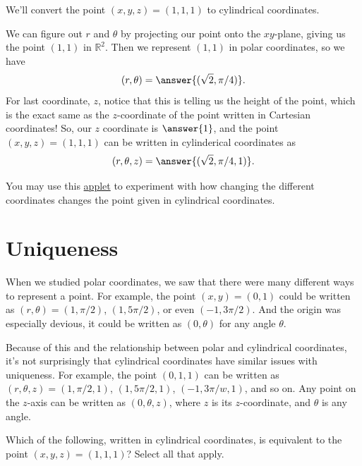 \documentclass{ximera}
\begin{document}
\begin{example}
We'll convert the point $(x,y,z) = (1,1,1)$ to cylindrical coordinates.

We can figure out $r$ and $\theta$ by projecting our point onto the $xy$-plane, giving us the point $(1,1)$ in $\mathbb{R}^2$. Then we represent $(1,1)$ in polar coordinates, so we have
\[
(r,\theta) = \answer{(\sqrt{2}, \pi/4)}.
\]
For last coordinate, $z$, notice that this is telling us the height of the point, which is the exact same as the $z$-coordinate of the point written in Cartesian coordinates! So, our $z$ coordinate is $\answer{1}$, and the point $(x,y,z) = (1,1,1)$ can be written in cylinderical coordinates as
\[
(r,\theta,z) = \answer{(\sqrt{2}, \pi/4, 1)}.
\]
\end{example}

You may use this \href{https://mathinsight.org/cylindrical_coordinates}{applet} to experiment with how changing the different coordinates changes the point given in cylindrical coordinates.

\section*{Uniqueness}

When we studied polar coordinates, we saw that there were many different ways to represent a point. For example, the point $(x,y) = (0,1)$ could be written as $(r,\theta) = (1,\pi/2)$, $(1,5\pi/2)$, or even $(-1,3\pi/2)$. And the origin was especially devious, it could be written as $(0,\theta)$ for any angle $\theta$.

Because of this and the relationship between polar and cylindrical coordinates, it's not surprisingly that cylindrical coordinates have similar issues with uniqueness. For example, the point $(0,1,1)$ can be written as $(r,\theta, z) = (1,\pi/2,1)$, $(1,5\pi/2,1)$, $(-1, 3\pi/w, 1)$, and so on. Any point on the $z$-axis can be written as $(0,\theta,z)$, where $z$ is its $z$-coordinate, and $\theta$ is any angle.

\begin{problem}
Which of the following, written in cylindrical coordinates, is equivalent to the point $(x,y,z) = (1,1,1)$? Select all that apply.
\begin{selectAll}
\end{selectAll}
\end{problem}
\end{document}
